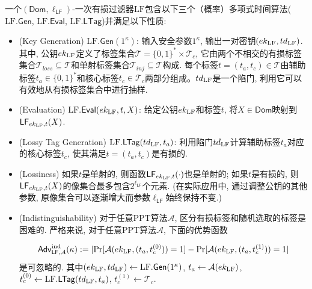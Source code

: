 \begin{definition}[一次有损过滤器]\label{defn:LF}
一个$(\mathsf{Dom},\ell_{\mathsf{LF}})$-一次有损过滤器$\text{LF}$包含以下三个（概率）多项式时间算法($\text{LF}.\mathsf{Gen}$, $\text{LF}.\mathsf{Eval}$, $\text{LF}.\mathsf{LTag}$)并满足以下性质:
\begin{itemize}[noitemsep,topsep=0pt]
\item (Key Generation) $\text{LF}.\mathsf{Gen}(1^\kappa)$: 输入安全参数$1^\kappa$, 输出一对密钥$(ek_{\text{LF}},td_{\text{LF}})$. 其中, 公钥$ek_{\text{LF}}$定义了标签集合$\mathcal{T}=\{0,1\}^*\times\mathcal{T}_c$, 它由两个不相交的有损标签集合$\mathcal{T}_{loss}\subseteq\mathcal{T}$和单射标签集合$\mathcal{T}_{inj}\subseteq\mathcal{T}$构成. 每个标签$t=(t_a,t_c)\in\mathcal{T}$由辅助标签$t_a\in\{0,1\}^*$和核心标签$t_c\in\mathcal{T}_c$两部分组成。$td_{\text{LF}}$是一个陷门, 利用它可以有效地从有损标签集合中进行抽样. 

\item (Evaluation) $\text{LF}.\mathsf{Eval}(ek_{\text{LF}},t,X)$: 给定公钥$ek_{\text{LF}}$和标签$t$, 将$X\in\mathsf{Dom}$映射到$\mathsf{LF}_{ek_{\text{LF}},t}(X)$.

\item (Lossy Tag Generation) $\text{LF}.\mathsf{LTag}(td_{\text{LF}},t_a)$: 利用陷门$td_{\text{LF}}$计算辅助标签$t_a$对应的核心标签$t_c$, 使其满足$t=(t_a,t_c)$是有损的.

\item (Lossiness) 如果$t$是单射的, 则函数$\mathsf{LF}_{ek_{\text{LF}},t}(\cdot)$也是单射的; 如果$t$是有损的, 则$\mathsf{LF}_{ek_{\text{LF}},t}(X)$的像集合最多包含$2^{\ell_{\mathsf{LF}}}$个元素. (在实际应用中, 通过调整公钥的其他参数, 原像集合可以逐渐增大而参数$\ell_{\mathsf{LF}}$始终保持不变.)

\item (Indistinguishability) 对于任意PPT算法$\mathcal{A}$, 区分有损标签和随机选取的标签是困难的. 严格来说, 对于任意PPT算法$\mathcal{A}$, 下面的优势函数

\begin{displaymath}
 \mathsf{Adv}_{\mathsf{LF},\mathcal{A}}^{\textup{ind}}(\kappa):=|\textup{Pr}[\mathcal{A}(ek_{\text{LF}},(t_a,t_c^{(0)}))=1] -\textup{Pr}[\mathcal{A}(ek_{\text{LF}},(t_a,t_c^{(1)}))=1|
 \end{displaymath}
是可忽略的. 其中$(ek_{\text{LF}},td_{\text{LF}})\leftarrow \text{LF}.\mathsf{Gen}(1^\kappa)$, $t_a\leftarrow\mathcal{A}(ek_{\text{LF}})$, $t_c^{(0)}\leftarrow \text{LF}.\mathsf{LTag}(td_{\text{LF}},t_a)$, $t_c^{(1)}\leftarrow \mathcal{T}_c$.


\end{itemize}
\end{definition}
